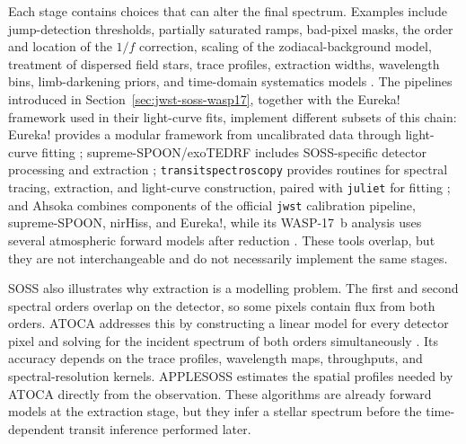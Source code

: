 Each stage contains choices that can alter the final spectrum. Examples include
jump-detection thresholds, partially saturated ramps, bad-pixel masks, the
order and location of the $1/f$ correction, scaling of the zodiacal-background
model, treatment of dispersed field stars, trace profiles, extraction widths,
wavelength bins, limb-darkening priors, and time-domain systematics models
\citep{RadicaEtAl2023,HolmbergMadhusudhan2023,LouieEtAl2025}. The pipelines
introduced in Section~\ref{sec:jwst-soss-wasp17}, together with the Eureka!
framework used in their light-curve fits, implement different subsets of this
chain: Eureka! provides a modular framework from uncalibrated data through
light-curve fitting \citep{BellEtAl2022}; supreme-SPOON/exoTEDRF
includes SOSS-specific detector processing and extraction
\citep{RadicaEtAl2023,Radica2024}; \texttt{transitspectroscopy} provides
routines for spectral tracing, extraction, and light-curve construction,
paired with \texttt{juliet} for fitting
\citep{Espinoza2022TransitSpectroscopy,EspinozaEtAl2019}; and Ahsoka combines
components of the official \texttt{jwst} calibration pipeline, supreme-SPOON,
nirHiss, and Eureka!, while its WASP-17~b analysis uses several atmospheric
forward models after reduction \citep{LouieEtAl2025}. These tools overlap, but
they are not interchangeable and do not necessarily implement the same stages.


SOSS also illustrates why extraction is a modelling problem. The first and
second spectral orders overlap on the detector, so some pixels contain flux
from both orders. ATOCA addresses this by constructing a linear model for every
detector pixel and solving for the incident spectrum of both orders
simultaneously \citep{DarveauBernierEtAl2022}. Its accuracy depends on the trace
profiles, wavelength maps, throughputs, and spectral-resolution kernels.
APPLESOSS \citep{RadicaEtAl2022} estimates the spatial profiles needed by ATOCA
directly from the observation. These algorithms are already forward models
at the extraction stage, but they infer a stellar spectrum before the
time-dependent transit inference performed later.


